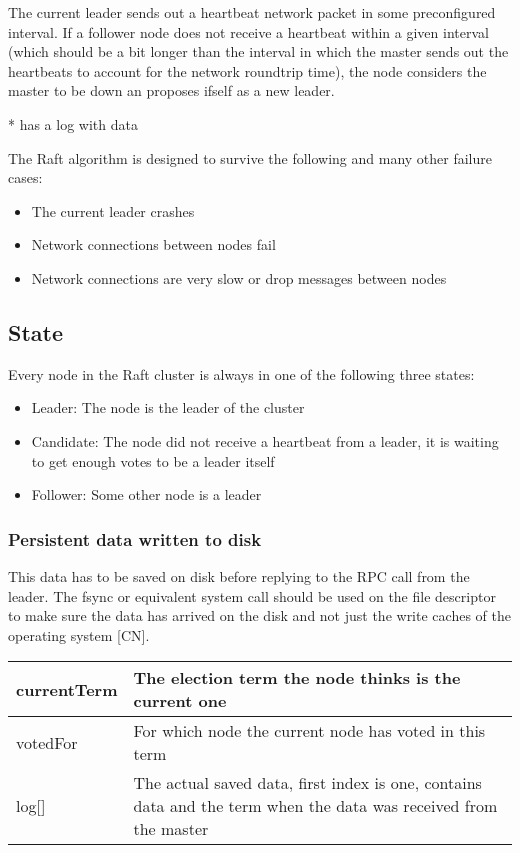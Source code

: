 The current leader sends out a heartbeat network packet in some preconfigured interval. If a follower node does not receive a heartbeat within a given interval (which should be a bit longer than the interval in which the master sends out the heartbeats to account for the network roundtrip time), the node considers the master to be down an proposes ifself as a new leader.

* has a log with data

The Raft algorithm is designed to survive the following and many other failure cases:
\begin{itemize}
    \item The current leader crashes
    \item Network connections between nodes fail
    \item Network connections are very slow or drop messages between nodes
\end{itemize}

\subsection{State}
Every node in the Raft cluster is always in one of the following three states:
\begin{itemize}
    \item Leader: The node is the leader of the cluster
    \item Candidate: The node did not receive a heartbeat from a leader, it is waiting to get enough votes to be a leader itself
    \item Follower: Some other node is a leader
\end{itemize}

\subsubsection*{Persistent data written to disk}

This data has to be saved on disk before replying to the RPC call from the leader. The fsync or equivalent system call should be used on the file descriptor to make sure the data has arrived on the disk and not just the write caches of the operating system [CN].

\begin{tabular}{ | l | p{} | }
\hline
currentTerm & The election term the node thinks is the current one \\ \hline
votedFor & For which node the current node has voted in this term \\ \hline
log[] & The actual saved data, first index is one, contains data and the term when the data was received from the master \\ \hline
\end{tabular}

